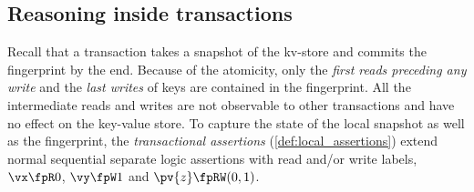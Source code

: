 \subsection{Reasoning inside transactions}

Recall that a transaction takes a snapshot of the kv-store and commits the fingerprint by the end.
Because of the atomicity, only the \emph{first reads preceding any write} and the \emph{last writes} of keys are contained in the fingerprint.
All the intermediate reads and writes are not observable to other transactions and have no effect on the key-value store.
To capture the state of the local snapshot as well as the fingerprint, 
the \emph{transactional assertions} (\cref{def:local_assertions}) extend normal sequential separate logic assertions with read and/or write labels, 
\eg \( \vx \fpR 0 \), \( \vy \fpW 1 \) and \( \pv{z} \fpRW (0,1) \).


